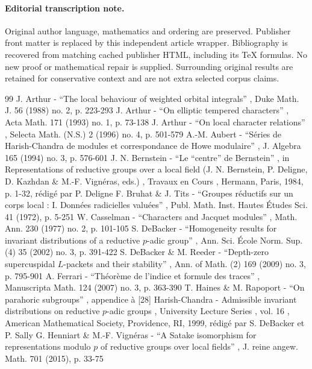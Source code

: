 \documentclass[11pt]{article}
\numberwithin{equation}{section}\providecommand{\og}{«\,}\providecommand{\fg}{\,»}
\begin{document}
\paragraph{Editorial transcription note.}
Original author language, mathematics and ordering are preserved. Publisher front matter is replaced by this independent article wrapper. Bibliography is recovered from matching cached publisher HTML, including its TeX formulas. No new proof or mathematical repair is supplied. Surrounding original results are retained for conservative context and are not extra selected corpus claims.
\clearpage

\begin{thebibliography}{99}
 J. Arthur - “The local behaviour of weighted orbital integrals” , Duke Math. J. 56 (1988) no. 2, p. 223-293
 J. Arthur - “On elliptic tempered characters” , Acta Math. 171 (1993) no. 1, p. 73-138
 J. Arthur - “On local character relations” , Selecta Math. (N.S.) 2 (1996) no. 4, p. 501-579
 A.-M. Aubert - “Séries de Harish-Chandra de modules et correspondance de Howe modulaire” , J. Algebra 165 (1994) no. 3, p. 576-601
 J. N. Bernstein - “Le “centre” de Bernstein” , in Representations of reductive groups over a local field (J. N. Bernstein, P. Deligne, D. Kazhdan \& M.-F. Vignéras, eds.) , Travaux en Cours , Hermann, Paris, 1984, p. 1-32, rédigé par P. Deligne
 F. Bruhat \& J. Tits - “Groupes réductifs sur un corps local : I. Données radicielles valuées” , Publ. Math. Inst. Hautes Études Sci. 41 (1972), p. 5-251
 W. Casselman - “Characters and Jacquet modules” , Math. Ann. 230 (1977) no. 2, p. 101-105
 S. DeBacker - “Homogeneity results for invariant distributions of a reductive $p$-adic group” , Ann. Sci. École Norm. Sup. (4) 35 (2002) no. 3, p. 391-422
 S. DeBacker \& M. Reeder - “Depth-zero supercuspidal $L$-packets and their stability” , Ann. of Math. (2) 169 (2009) no. 3, p. 795-901
 A. Ferrari - “Théorème de l’indice et formule des traces” , Manuscripta Math. 124 (2007) no. 3, p. 363-390
 T. Haines \& M. Rapoport - “On parahoric subgroups” , appendice à [28]
 Harish-Chandra - Admissible invariant distributions on reductive $p$-adic groups , University Lecture Series , vol. 16 , American Mathematical Society, Providence, RI, 1999, rédigé par S. DeBacker et P. Sally
 G. Henniart \& M.-F. Vignéras - “A Satake isomorphism for representations modulo $p$ of reductive groups over local fields” , J. reine angew. Math. 701 (2015), p. 33-75

\end{thebibliography}
\end{document}
